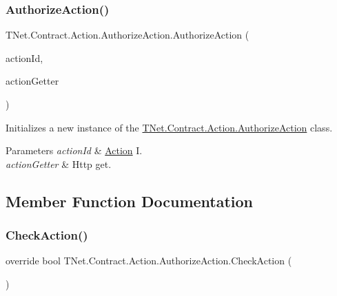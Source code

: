 \subsubsection{\texorpdfstring{Authorize\+Action()}{AuthorizeAction()}}
{\footnotesize\ttfamily T\+Net.\+Contract.\+Action.\+Authorize\+Action.\+Authorize\+Action (\begin{DoxyParamCaption}\item[{int}]{action\+Id,  }\item[{\mbox{\hyperlink{class_t_net_1_1_service_1_1_action_getter}{Action\+Getter}}}]{action\+Getter }\end{DoxyParamCaption})\hspace{0.3cm}{\ttfamily [protected]}}



Initializes a new instance of the \mbox{\hyperlink{class_t_net_1_1_contract_1_1_action_1_1_authorize_action}{T\+Net.\+Contract.\+Action.\+Authorize\+Action}} class. 


\begin{DoxyParams}{Parameters}
{\em action\+Id} & \mbox{\hyperlink{namespace_t_net_1_1_contract_1_1_action}{Action}} I.\\
\hline
{\em action\+Getter} & Http get.\\
\hline
\end{DoxyParams}


\subsection{Member Function Documentation}
\mbox{\label{class_t_net_1_1_contract_1_1_action_1_1_authorize_action_ab0e2a7e8dacbac0da60cf5415ab5fcaf}} 
\subsubsection{\texorpdfstring{Check\+Action()}{CheckAction()}}
{\footnotesize\ttfamily override bool T\+Net.\+Contract.\+Action.\+Authorize\+Action.\+Check\+Action (\begin{DoxyParamCaption}{ }\end{DoxyParamCaption})\hspace{0.3cm}{\ttfamily [virtual]}}





